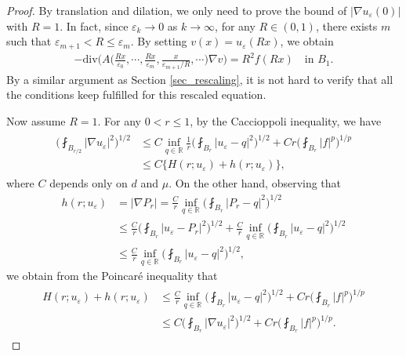 \documentclass[reqno,12pt]{amsart} %
\theoremstyle{definition}
\theoremstyle{remark}
\numberwithin{equation}{section}
\newcommand{\e}{\varepsilon}
\begin{document}
\begin{proof}
  By translation and dilation, we only need to prove the bound of $|\nabla u_\e(0)|$ with $R=1$. In fact, since $\varepsilon_k \rightarrow 0$ as $k\rightarrow \infty$, for any $R\in (0,1)$, there exists $m$ such that $\varepsilon_{m+1}<R\leq \varepsilon_m$. By setting $v(x)=u_\varepsilon(Rx)$, we obtain
  \begin{align*}
    -\mathrm{div}\Big( A \Big( \frac{Rx}{\e_0} , \cdots, \frac{Rx}{\varepsilon_m}, \frac{x}{\varepsilon_{m+1}/R}, \cdots \Big) \nabla v \Big) = R^2f(Rx)\quad \text{in }B_{1}. 
  \end{align*}
  By a similar argument as Section \ref{sec_rescaling}, it is not hard to verify that all the conditions keep fulfilled for this rescaled equation.   
  
  Now assume $R = 1$. For any $0<r\leq 1$, by the Caccioppoli inequality, we have
  \begin{align}\label{est.Du-Hh}
  \begin{aligned}
    \bigg(\fint_{B_{r/2}}|\nabla u_\varepsilon|^2\bigg)^{1/2} & \leq C\inf_{q\in \mathbb{R}}\frac{1}{r}\bigg(\fint_{B_r}|u_\varepsilon-q|^2\bigg)^{1/2} + Cr\bigg(\fint_{B_r}|f|^p\bigg)^{1/p} \\
    & \leq C\{H(r; u_\varepsilon)+h(r; u_\varepsilon)\},
    \end{aligned}
  \end{align}
  where $C$ depends only on $d$ and $\mu$. On the other hand, observing that
  \begin{align*}
      h(r; u_\varepsilon)&= |\nabla P_r| = \frac{C}{r}\inf_{q\in\mathbb{R}}\bigg(\fint_{B_r}|P_r-q|^2\bigg)^{1/2}\\&\leq \frac{C}{r}\bigg(\fint_{B_r}|u_\varepsilon-P_r|^2\bigg)^{1/2}+\frac{C}{r}\inf_{q\in\mathbb{R}}\bigg(\fint_{B_r}|u_\varepsilon-q|^2\bigg)^{1/2}\\& \leq \frac{C}{r}\inf_{q\in\mathbb{R}}\bigg(\fint_{B_r}|u_\varepsilon-q|^2\bigg)^{1/2},
  \end{align*}
we obtain from the Poincar\'{e} inequality that
  \begin{align}\label{est.Hh-Du}
  \begin{aligned}
    H(r; u_\varepsilon)+h(r; u_\varepsilon)&\leq \frac{C}{r}\inf_{q\in\mathbb{R}}\bigg(\fint_{B_r}|u_\varepsilon-q|^2\bigg)^{1/2}+Cr\bigg(\fint_{B_r}|f|^p\bigg)^{1/p}\\&\leq C\bigg(\fint_{B_{r}}|\nabla u_\varepsilon|^2\bigg)^{1/2}+Cr\bigg(\fint_{B_r}|f|^p\bigg)^{1/p}.
    \end{aligned}

\end{align}
\end{proof}
\end{document}
